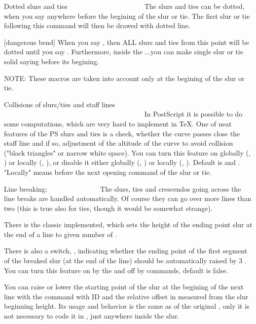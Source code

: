 Dotted slurs and ties
~~~~~~~~~~~~~~~~~~~~~
The slurs and ties can be dotted, when you say \dotted anywhere before
the begining of the slur or tie. The first slur or tie following this
command will then be drawed with dotted line.

[dangerous bend]  When you say \Dotted, then ALL slurs and ties
                  from this point will be dotted until you say
\Solid. Furthermore, inside the \Dotted...\Solid you can make single slur or
tie solid saying \solid before its begining.

NOTE: These macros are taken into account only at the begining
      of the slur or tie.


Collisions of slurs/ties and staff lines
~~~~~~~~~~~~~~~~~~~~~~~~~~~~~~~~~~~~~~~~
In PostScript it is possible to do some computations, which are very hard
to implement in TeX. One of neat features of the PS slurs and ties is a
check, whether the curve passes close the staff line and if so, adjustment
of the altitude of the curve to avoid collision ("black triangles" or narrow
white space). You can turn this feature on globally (\Sluradjust,
\Tieadjust) or locally (\sluradjust, \tieadjust), or disable it either
globally (\Nosluradjust, \Notieadjust) or locally (\nosluradjust,
\notieadjust). Default is \Sluradjust and \Notieadjust. "Locally"
means before the next opening command of the slur or tie.


Line breaking:
~~~~~~~~~~~~~~
The slurs, ties and crescendos going across the line breaks are handled
automatically. Of course they can go over more lines than two (this is
true also for ties, though it would be somewhat strange).

There is the classic \breakslur implemented, which sets the height of the
ending point slur at the end of a line to given number of \internotes.

There is also a switch, \ifslopebrkslurs, indicating whether the ending point
of the first segment of the breaked slur (at the end of the line) should
be automatically raised by 3 \internote. You can turn this feature on by
the \slopebrkslurstrue and off by \slopebrkslursfalse commands, default
is false.

You can raise or lower the starting point of the slur at the begining of
the next line with the command \liftslur with ID and the relative offset in
\internotes measured from the slur beginning height. Its usage and behavior
is the same as of the original \liftslur, only it is not necessary to code
it in \atnextstaff{}, just anywhere inside the slur.

